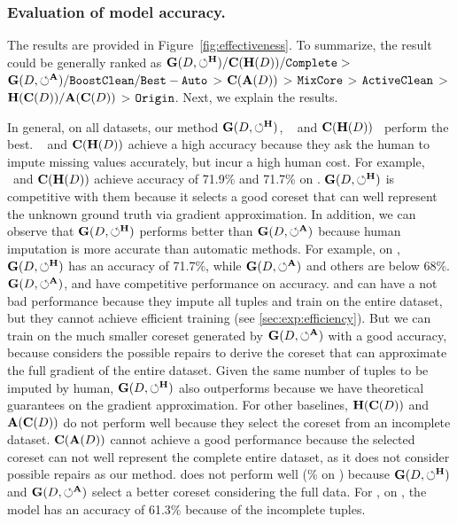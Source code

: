 \subsubsection{Evaluation of model accuracy.}
The results are provided in Figure~\ref{fig:effectiveness}. To summarize, the result could be generally ranked as $\mathbf{G}(D,\circlearrowleft^\mathbf{H})/\mathbf{C}(\mathbf{H}(D))/{\tt Complete} > $ $\mathbf{G}(D,\circlearrowleft^\mathbf{A})/{\tt BoostClean} /{\tt Best-Auto} $ > $\mathbf{C}(\mathbf{A}(D))$ > ${\tt MixCore}$ > ${\tt ActiveClean}$ > $\mathbf{H}(\mathbf{C}(D))/\mathbf{A}(\mathbf{C}(D))$ > ${\tt Origin}$.
Next, we explain the results.

In general, on all datasets, our method $\mathbf{G}(D,\circlearrowleft^\mathbf{H})$, \truth~ and $\mathbf{C}(\mathbf{H}(D))$~   perform the best. 
 \truth~ and $\mathbf{C}(\mathbf{H}(D))$ achieve a high accuracy because they ask the human to impute missing values accurately, but incur a high human cost.  For example, \truth~and $\mathbf{C}(\mathbf{H}(D))$ achieve accuracy of 71.9\% and 71.7\% on \adult. $\mathbf{G}(D,\circlearrowleft^\mathbf{H})$  is competitive with them because it selects a good coreset that can well represent the unknown ground truth via gradient approximation. In addition, we can observe that $\mathbf{G}(D,\circlearrowleft^\mathbf{H})$ performs better than $\mathbf{G}(D,\circlearrowleft^\mathbf{A})$ because human imputation is more accurate than automatic methods. For example, on \adult, $\mathbf{G}(D,\circlearrowleft^\mathbf{H})$ has an accuracy of 71.7\%, while $\mathbf{G}(D,\circlearrowleft^\mathbf{A})$ and others are below 68\%. $\mathbf{G}(D,\circlearrowleft^\mathbf{A})$, \boostclean and \gain have competitive performance on accuracy. \boostclean and \gain can have a not bad performance because they impute all tuples and train on the entire dataset, but they cannot achieve efficient training (see \ref{sec:exp:efficiency}). But  we can train on the much smaller coreset generated by $\mathbf{G}(D,\circlearrowleft^\mathbf{A})$ with a good accuracy, because \ours considers the possible repairs to derive the coreset  that can approximate the full gradient of the entire dataset. Given the same number of tuples to be imputed by human,  $\mathbf{G}(D,\circlearrowleft^\mathbf{H})$ also outperforms \actclean because we have theoretical guarantees on the gradient approximation. 
  For other baselines,  $\mathbf{H}(\mathbf{C}(D))$ and $\mathbf{A}(\mathbf{C}(D))$ do not perform well because they select the coreset from an incomplete dataset.  $\mathbf{C}(\mathbf{A}(D))$ cannot achieve a good performance because the selected coreset can not well represent the complete entire dataset, as it does not consider possible repairs as our method.  %
  {\mixcore} does not perform well (\% on \adult) because $\mathbf{G}(D,\circlearrowleft^\mathbf{H})$ and $\mathbf{G}(D,\circlearrowleft^\mathbf{A})$ select a better coreset considering the full data. For \noclean, on  \adult, the model  has an accuracy of 61.3\% because of the incomplete tuples.



